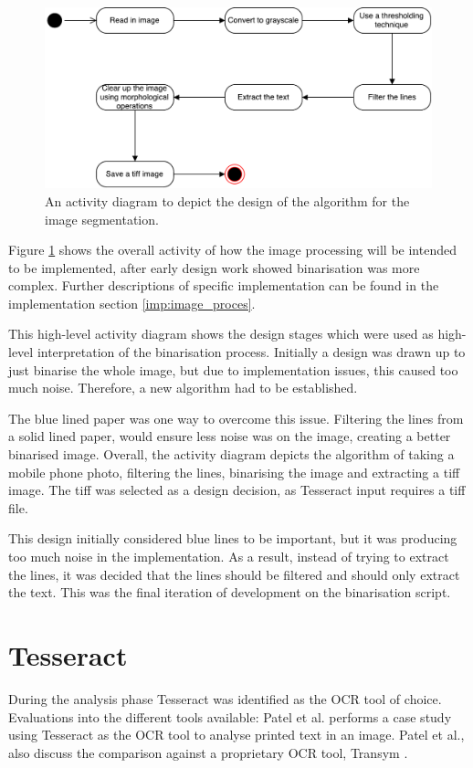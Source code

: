 \begin{figure}[H]
  \centering
  \includegraphics[scale=0.4]{images/image_binarisation_activity.pdf}
  \caption{An activity diagram to depict the design of the algorithm for the image segmentation.}
  \label{fig:activity_binarise}
\end{figure}

Figure \ref{fig:activity_binarise} shows the overall activity of how the image processing will be intended to be implemented, after early design work showed binarisation was more complex. Further descriptions of specific implementation can be found in the implementation section \ref{imp:image_proces}.

This high-level activity diagram shows the design stages which were used as high-level interpretation of the binarisation process. Initially a design was drawn up to just binarise the whole image, but due to implementation issues, this caused too much noise. Therefore, a new algorithm had to be established.

The blue lined paper was one way to overcome this issue. Filtering the lines from a solid lined paper, would ensure less noise was on the image, creating a better binarised image. Overall, the activity diagram depicts the algorithm of taking a mobile phone photo, filtering the lines, binarising the image and extracting a tiff image. The tiff was selected as a design decision, as Tesseract input requires a tiff file.

This design initially considered blue lines to be important, but it was producing too much noise in the implementation. As a result, instead of trying to extract the lines, it was decided that the lines should be filtered and should only extract the text. This was the final iteration of development on the binarisation script.

\section{Tesseract}
During the analysis phase Tesseract was identified as the OCR tool of choice. Evaluations into the different tools available: Patel et al. \cite{citeulike:13920892} performs a case study using Tesseract as the OCR tool to analyse printed text in an image. Patel et al., also discuss the comparison against a proprietary OCR tool, Transym \cite{citeulike:14023819}.


